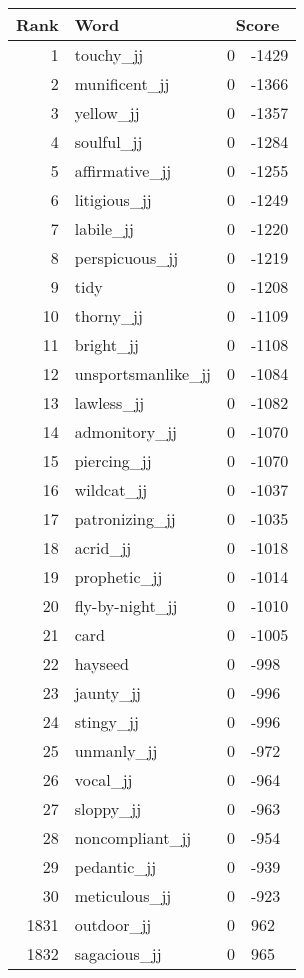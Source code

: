 \begin{longtable}[!htbp]{| rlr@{.}l |}
    \hline
    \textbf{Rank} & \textbf{Word} & \multicolumn{2}{c|}{\textbf{Score}} \\
    \hline
    \endhead
    1 & touchy\_jj & 0 & -1429 \\
    2 & munificent\_jj & 0 & -1366 \\
    3 & yellow\_jj & 0 & -1357 \\
    4 & soulful\_jj & 0 & -1284 \\
    5 & affirmative\_jj & 0 & -1255 \\
    6 & litigious\_jj & 0 & -1249 \\
    7 & labile\_jj & 0 & -1220 \\
    8 & perspicuous\_jj & 0 & -1219 \\
    9 & tidy & 0 & -1208 \\
    10 & thorny\_jj & 0 & -1109 \\
    11 & bright\_jj & 0 & -1108 \\
    12 & unsportsmanlike\_jj & 0 & -1084 \\
    13 & lawless\_jj & 0 & -1082 \\
    14 & admonitory\_jj & 0 & -1070 \\
    15 & piercing\_jj & 0 & -1070 \\
    16 & wildcat\_jj & 0 & -1037 \\
    17 & patronizing\_jj & 0 & -1035 \\
    18 & acrid\_jj & 0 & -1018 \\
    19 & prophetic\_jj & 0 & -1014 \\
    20 & fly-by-night\_jj & 0 & -1010 \\
    21 & card & 0 & -1005 \\
    22 & hayseed & 0 & -998 \\
    23 & jaunty\_jj & 0 & -996 \\
    24 & stingy\_jj & 0 & -996 \\
    25 & unmanly\_jj & 0 & -972 \\
    26 & vocal\_jj & 0 & -964 \\
    27 & sloppy\_jj & 0 & -963 \\
    28 & noncompliant\_jj & 0 & -954 \\
    29 & pedantic\_jj & 0 & -939 \\
    30 & meticulous\_jj & 0 & -923 \\
    1831 & outdoor\_jj & 0 & 962 \\
    1832 & sagacious\_jj & 0 & 965 \\

\end{longtable}

